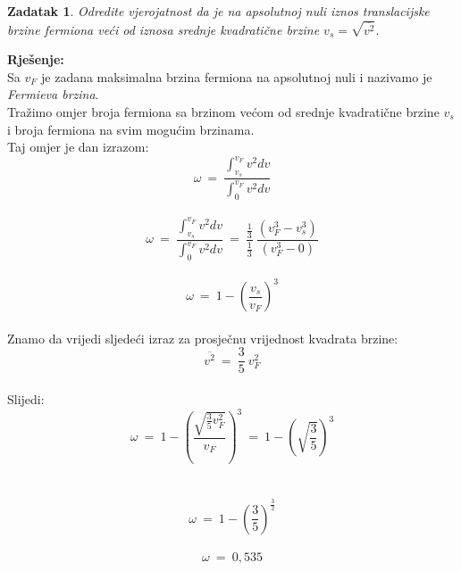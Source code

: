 \documentclass[a4paper,12pt]{article}
\newtheorem{ZDK}{Zadatak}[section]
\begin{document}
\newpage
\begin{ZDK}
	Odredite vjerojatnost da je na apsolutnoj nuli iznos translacijske brzine fermiona ve\'ci od iznosa srednje kvadrati\v{c}ne brzine $v_s=\sqrt{\overline{v^2}}$.
\end{ZDK}
\textbf{Rje\v{s}enje:} \\
\newline
Sa $v_F$ je zadana maksimalna brzina fermiona na apsolutnoj nuli i nazivamo je \textit{Fermieva brzina}. \\
Tra\v{z}imo omjer broja fermiona sa brzinom ve\'com od srednje kvadrati\v{c}ne brzine $v_s$ i broja fermiona na svim mogu\'cim brzinama. \\
Taj omjer je dan izrazom:
\\
$$ \omega\ =\ \frac{\int_{v_s}^{v_F}v^2dv}{\int_{0}^{v_F}v^2dv} $$
\\
$$ \omega\ =\ \frac{\int_{v_s}^{v_F}v^2dv}{\int_{0}^{v_F}v^2dv}\ =\ \frac{\frac{1}{3}}{\frac{1}{3}}\ \frac{(v_{F}^{3}-v_{s}^{3})}{(v_{F}^{3}-0)} $$
\\
$$ \omega\ =\ 1-\left( \frac{v_s}{v_F} \right)^3 $$
\\
Znamo da vrijedi sljede\'ci izraz za prosje\v{c}nu vrijednost kvadrata brzine: 
$$ \overline{v^2}\ =\ \frac{3}{5}\ v_F^2 $$
\\
Slijedi:
\\
$$ \omega\ =\ 1-\left( \frac{\sqrt{\frac{3}{5}v_F^2}}{v_F} \right)^3\ =\ 1-\left( \sqrt{\frac{3}{5}} \right)^3 $$
\\
\\
$$ \omega\ =\ 1-\left( \frac{3}{5}  \right)^{\frac{3}{2}} $$
\\
$$ \omega\ =\ 0,535 $$
\end{document}
